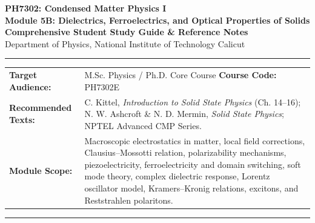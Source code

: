 \documentclass[11pt,a4paper]{article}
\begin{document}
\begin{center}
    {\LARGE \textbf{\color{primary}PH7302: Condensed Matter Physics I}}\\[6pt]
    {\Large \textbf{Module 5B: Dielectrics, Ferroelectrics, and Optical Properties of Solids}}\\[4pt]
    {\large \textbf{\color{secondary}Comprehensive Student Study Guide \& Reference Notes}}\\[6pt]
    \small Department of Physics, National Institute of Technology Calicut
\end{center}

\vspace{0.1cm}
\hrule
\vspace{0.25cm}

\begin{tabularx}{\textwidth}{@{}l X@{}}
    \textbf{Target Audience:} & M.Sc. Physics / Ph.D. Core Course \hfill \textbf{Course Code:} PH7302E \\
    \textbf{Recommended Texts:} & C. Kittel, \textit{Introduction to Solid State Physics} (Ch. 14--16); N. W. Ashcroft \& N. D. Mermin, \textit{Solid State Physics}; NPTEL Advanced CMP Series. \\
    \textbf{Module Scope:} & Macroscopic electrostatics in matter, local field corrections, Clausius--Mossotti relation, polarizability mechanisms, piezoelectricity, ferroelectricity and domain switching, soft mode theory, complex dielectric response, Lorentz oscillator model, Kramers--Kronig relations, excitons, and Reststrahlen polaritons. \\
\end{tabularx}

\vspace{0.25cm}
\hrule
\vspace{0.3cm}
\end{document}
